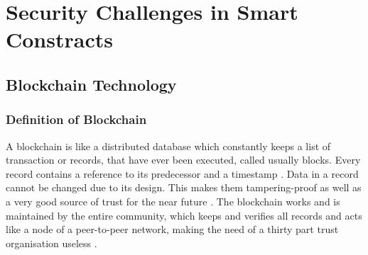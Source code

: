 \chapter{Security Challenges in Smart Constracts}


\newpage

\minitoc %

\newpage


\section{Blockchain Technology}
\subsection{Definition of Blockchain}
A blockchain is like a distributed database which constantly keeps a list of transaction or records, that have ever been executed, called usually blocks. Every record contains a reference to its predecessor and a timestamp \cite{wikipedia1}.
Data in a record cannot be changed due to its design. This makes them tampering-proof as well as a very good source of trust for the near future \cite{blockchain3}.
The blockchain works and is maintained by the entire community, which keeps and verifies all records and acts like a node of a peer-to-peer network, making the need of a thirty part trust organisation useless \cite{blockchain0}.
